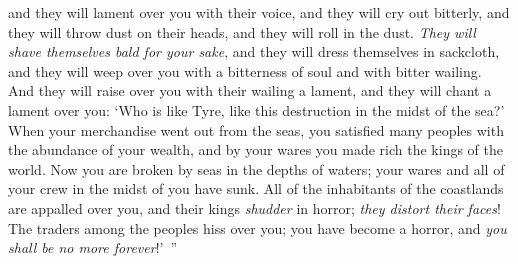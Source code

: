 \begin{biblechapter}
\verse and they will lament over you with their voice, 
and they will cry out bitterly, 
and they will throw dust on their heads, 
and they will roll in the dust.
\verse \textit{They will shave themselves bald for your sake}, 
and they will dress themselves in sackcloth, 
and they will weep over you with a bitterness of soul 
and with bitter wailing.
\verse And they will raise over you with their wailing a lament, 
and they will chant a lament over you: 
‘Who is like Tyre, 
like this destruction in the midst of the sea?’
\verse When your merchandise went out from the seas, 
you satisfied many peoples with the abundance of your wealth, 
and by your wares 
you made rich the kings of the world.
\verse Now you are broken by seas 
in the depths of waters; 
your wares and all of your crew 
in the midst of you have sunk.
\verse All of the inhabitants of the coastlands 
are appalled over you, 
and their kings \textit{shudder} in horror; 
\textit{they distort their faces}!
\verse The traders among the peoples hiss over you; 
you have become a horror, 
and \textit{you shall be no more forever}!’ ”
\end{biblechapter}

